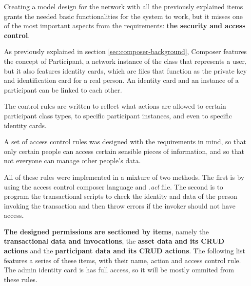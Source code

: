 Creating a model design for the network with all the previously explained items grants the needed basic functionalities for the system to work, but it misses one of the most important aspects from the requirements: \textbf{the security and access control}.

As previously explained in section \ref{sec:composer-background}, Composer features the concept of Participant, a network instance of the class that represents a user, but it also features identity cards, which are files that function as the private key and identification card for a real person. An identity card and an instance of a participant can be linked to each other.

The control rules are written to reflect what actions are allowed to certain participant class types, to specific participant instances, and even to specific identity cards. 


A set of access control rules was designed with the requirements in mind, so that only certain people can access certain sensible pieces of information, and so that not everyone can manage other people's data. 

 All of these rules were implemented in a mixture of two methods. The first is by using the access control composer language and \textit{.acl} file. The second is to program the transactional scripts to check the identity and data of the person invoking the transaction and then throw errors if the invoker should not have access.

 \textbf{The designed permissions are sectioned by items}, namely the \textbf{transactional data and invocations}, the \textbf{asset data and its CRUD actions} and the \textbf{participant data and its CRUD actions}. The following list features a series of these items, with their name, action and access control rule. The admin identity card is has full access, so it will be mostly ommited from these rules.

